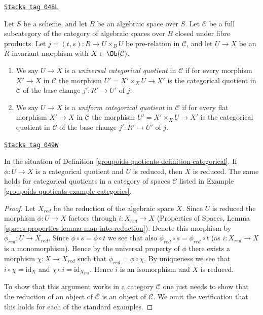 \begin{definition}
\label{groupoids-quotients-definition-universal-categorical}
\href{https://stacks.math.columbia.edu/tag/048L}{\texttt{Stacks tag 048L}}

Let $S$ be a scheme, and let $B$ be an algebraic space over $S$.
Let $\mathcal{C}$ be a full subcategory of the category of algebraic
spaces over $B$ closed under fibre products.
Let $j = (t, s) : R \to U \times_B U$ be pre-relation in
$\mathcal{C}$, and let $U \to X$ be an $R$-invariant morphism with
$X \in \Ob(\mathcal{C})$.
\begin{enumerate}
\item We say $U \to X$ is a {\it universal categorical quotient}
in $\mathcal{C}$ if for every morphism $X' \to X$ in $\mathcal{C}$
the morphism $U' = X' \times_X U \to X'$ is the categorical quotient in
$\mathcal{C}$ of the base change $j' : R' \to U'$ of $j$.
\item We say $U \to X$ is a {\it uniform categorical quotient}
in $\mathcal{C}$ if for every flat morphism $X' \to X$ in $\mathcal{C}$
the morphism $U' = X' \times_X U \to X'$ is the categorical quotient in
$\mathcal{C}$ of the base change $j' : R' \to U'$ of $j$.
\end{enumerate}
\end{definition}

\begin{lemma}
\label{groupoids-quotients-lemma-categorical-reduced}
\href{https://stacks.math.columbia.edu/tag/049W}{\texttt{Stacks tag 049W}}

In the situation of
Definition \ref{groupoids-quotients-definition-categorical}.
If $\phi : U \to X$ is a categorical quotient and $U$ is reduced,
then $X$ is reduced. The same holds for categorical quotients in
a category of spaces $\mathcal{C}$ listed in
Example \ref{groupoids-quotients-example-categories}.
\end{lemma}

\begin{proof}
Let $X_{red}$ be the reduction of the algebraic space $X$.
Since $U$ is reduced the morphism $\phi : U \to X$ factors through
$i : X_{red} \to X$ (Properties of Spaces, Lemma
\ref{spaces-properties-lemma-map-into-reduction}). Denote this morphism
by $\phi_{red} : U \to X_{red}$. Since $\phi \circ s = \phi \circ t$ we
see that also $\phi_{red} \circ s = \phi_{red} \circ t$ (as
$i : X_{red} \to X$ is a monomorphism). Hence by the universal property
of $\phi$ there exists a morphism $\chi : X \to X_{red}$ such that
$\phi_{red} = \phi \circ \chi$. By uniqueness we see that
$i \circ \chi = \text{id}_X$ and $\chi \circ i = \text{id}_{X_{red}}$.
Hence $i$ is an isomorphism and $X$ is reduced.

\medskip\noindent
To show that this argument works in a category $\mathcal{C}$ one
just needs to show that the reduction of an object of $\mathcal{C}$
is an object of $\mathcal{C}$. We omit the verification that this
holds for each of the standard examples.
\end{proof}

